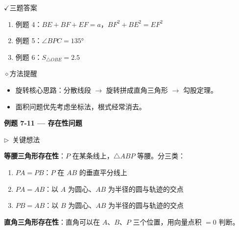 \documentclass{exam-zh}
\newcommand{\edukai}{\kaishu}
\newcommand{\eduSectionTitle}[1]{%
  \needspace{5\baselineskip}%
  \vspace{2mm}
  {\color{edu-blue}\bfseries\large #1}\par
  \vspace{3mm}
}
\newenvironment{eduAuxItem}[1]{%
  \needspace{4\baselineskip}%
  \vspace{2mm}
  \par\noindent
  \hangindent=8mm\hangafter=1
  {\color{edu-blue}\edukai $\triangleright$~#1}\enspace
  \begingroup
  \color{edu-ink}
  \edukai
}{%
  \endgroup
  \par
  \vspace{4mm}
}
\newcommand{\eduIconCheck}{\(\checkmark\)}
\newcommand{\eduIconPin}{\(\diamond\)}
\newenvironment{eduBulletList}{%
  \begin{itemize}[
    label=\textbullet,
    leftmargin=5mm,
    itemsep=1.2mm,
    topsep=0pt,
    parsep=0pt
  ]
}{%
  \end{itemize}
}
\newenvironment{eduBottomGrid}{%
  \vspace{1mm}
  \par\noindent
}{%
  \par\vspace{1mm}
}
\newenvironment{eduSummaryLeft}{%
  \begin{minipage}[t]{0.30\linewidth}
}{%
  \end{minipage}
}
\newcommand{\eduSummaryDivider}{%
  \hspace{4mm}{\color{edu-line}\vrule width 0.35pt}\hspace{7mm}%
}
\newenvironment{eduSummaryRight}{%
  \begin{minipage}[t]{0.58\linewidth}
}{%
  \end{minipage}
}
\newenvironment{eduPlainList}{%
  \begin{enumerate}[
    label=(\arabic*),
    leftmargin=7mm,
    itemsep=1.2mm,
    topsep=0pt,
    parsep=0pt
  ]
}{%
  \end{enumerate}
}
\begin{document}
\begin{eduBottomGrid}
  \begin{eduSummaryLeft}
    \begin{eduSummaryBlock}{\eduIconCheck}{三题答案}
    \begin{eduPlainList}
      \item 例题 4：$BE + BF + EF = a$，$BF^2 + BE^2 = EF^2$      \item 例题 5：$\angle BPC = 135°$      \item 例题 6：$S_{\triangle OBE} = 2.5$    \end{eduPlainList}
    \end{eduSummaryBlock}
  \end{eduSummaryLeft}
  \eduSummaryDivider
  \begin{eduSummaryRight}
    \begin{eduSummaryBlock}{\eduIconPin}{方法提醒}
    \begin{eduBulletList}
      \item 旋转核心思路：分散线段 $\to$ 旋转拼成直角三角形 $\to$ 勾股定理。      \item 面积问题优先考虑坐标法，根式经常消去。    \end{eduBulletList}
    \end{eduSummaryBlock}
  \end{eduSummaryRight}
\end{eduBottomGrid}



\eduSectionTitle{例题 7-11 — 存在性问题}

\begin{eduAuxItem}{关键想法}
\textbf{等腰三角形存在性}：$P$ 在某条线上，$\triangle ABP$ 等腰。分三类：
\begin{enumerate}
  \item $PA = PB$：$P$ 在 $AB$ 的垂直平分线上
  \item $PA = AB$：以 $A$ 为圆心、$AB$ 为半径的圆与轨迹的交点
  \item $PB = AB$：以 $B$ 为圆心、$AB$ 为半径的圆与轨迹的交点
\end{enumerate}

\textbf{直角三角形存在性}：直角可以在 $A$、$B$、$P$ 三个位置，用向量点积 $= 0$ 判断。
\end{eduAuxItem}
\end{document}
